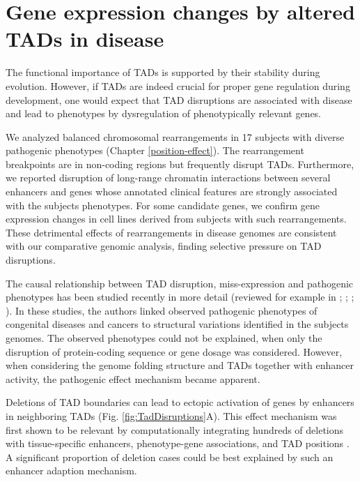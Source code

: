 \documentclass[a4paper,twoside=true,openright,parskip=full,chapterprefix=true,11pt,headings=normal,bibliography=totoc,listof=totoc,titlepage=on,captions=tableabove,draft=false]{scrreprt}
\theoremstyle{definition}
\theoremstyle{definition}
\theoremstyle{definition}
\theoremstyle{remark}
\begin{document}
\hypertarget{TAD-disease}{%
\section{Gene expression changes by altered TADs in
disease}\label{TAD-disease}}

The functional importance of TADs is supported by their stability during
evolution. However, if TADs are indeed crucial for proper gene
regulation during development, one would expect that TAD disruptions are
associated with disease and lead to phenotypes by dysregulation of
phenotypically relevant genes.

We analyzed balanced chromosomal rearrangements in 17 subjects with
diverse pathogenic phenotypes (Chapter \ref{position-effect}). The
rearrangement breakpoints are in non-coding regions but frequently
disrupt TADs. Furthermore, we reported disruption of long-range
chromatin interactions between several enhancers and genes whose
annotated clinical features are strongly associated with the subjects
phenotypes. For some candidate genes, we confirm gene expression changes
in cell lines derived from subjects with such rearrangements. These
detrimental effects of rearrangements in disease genomes are consistent
with our comparative genomic analysis, finding selective pressure on TAD
disruptions.

The causal relationship between TAD disruption, miss-expression and
pathogenic phenotypes has been studied recently in more detail (reviewed
for example in \citet{Krijger2016}; \citet{Achinger-Kawecka2017};
\citet{Yu2017}; \citet{Andrey2017}). In these studies, the authors
linked observed pathogenic phenotypes of congenital diseases and cancers
to structural variations identified in the subjects genomes. The
observed phenotypes could not be explained, when only the disruption of
protein-coding sequence or gene dosage was considered. However, when
considering the genome folding structure and TADs together with enhancer
activity, the pathogenic effect mechanism became apparent.

Deletions of TAD boundaries can lead to ectopic activation of genes by
enhancers in neighboring TADs (Fig. \ref{fig:TadDisruptions}A). This
effect mechanism was first shown to be relevant by computationally
integrating hundreds of deletions with tissue-specific enhancers,
phenotype-gene associations, and TAD positions \citep{Ibn-Salem2014}. A
significant proportion of deletion cases could be best explained by such
an enhancer adaption mechanism.
\end{document}
